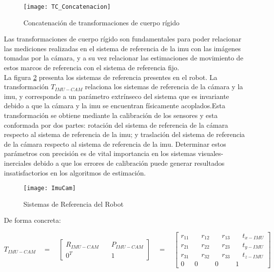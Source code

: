  \begin{figure}[H]
	\centering
	\texttt{[image: TC\_Concatenacion]}
	\caption[Concatenación de transformaciones de cuerpo rígido]{Concatenación de transformaciones de cuerpo rígido}
	\label{imagen:TC_Concatenacion}
\end{figure} 

Las transformaciones de cuerpo rígido son fundamentales para poder relacionar las mediciones realizadas en el sistema de referencia de la imu con las imágenes tomadas por la cámara, y a su vez relacionar las estimaciones de movimiento de estos marcos de referencia con el sistema de referencia fijo.\\

La figura \ref{fig:TransformacionesRobot} presenta los sistemas de referencia presentes en el robot. La transformación ${T}_{IMU-CAM}$ relaciona los sistemas de referencia de la cámara y la imu, y corresponde a un parámetro extrínseco del sistema que es invariante debido a que la cámara y la imu se encuentran físicamente acoplados.Esta transformación se obtiene mediante la calibración de los sensores y esta conformada por dos partes: rotación del sistema de referencia de la cámara respecto al sistema de referencia de la imu; y traslación del sistema de referencia de la cámara respecto al sistema de referencia de la imu. Determinar estos parámetros con precisión es de vital importancia en los sistemas visuales-inerciales debido a que los errores de calibración puede generar resultados insatisfactorios en los algoritmos de estimación.



\begin{figure}[H]
	\centering
	\texttt{[image: ImuCam]}
	\caption{Sistemas de Referencia del Robot }
	\label{fig:TransformacionesRobot}
\end{figure}


De forma concreta:

\begin{equation}
{ { T } }_{ IMU -CAM }\quad =\quad \begin{bmatrix} R_{ IMU - CAM } & \quad { { P } }_{ IMU - CAM } \\ { 0 }^{ T } & \quad 1 \end{bmatrix}\quad =\quad \begin{bmatrix} { r }_{ 11 } & { \quad r }_{ 12 } & { \quad r }_{ 13 } & \quad t_{ x-IMU } \\ { r }_{ 21 } & { \quad r }_{ 22 } & { \quad r }_{ 23 } & { \quad t }_{ y-IMU } \\ { r }_{ 31 } & { \quad r }_{ 32 } & { \quad r }_{ 33 } & \quad { t }_{ z-IMU } \\ 0 & 0 & 0 & 1 \end{bmatrix}\quad 
\label{eq:transformacionIMUCAM} 
\end{equation}

